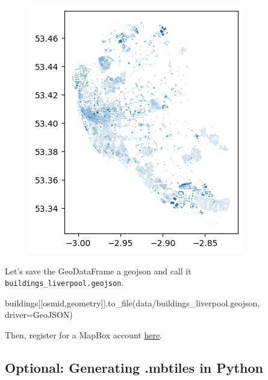 \documentclass[
  letterpaper,
  DIV=11,
  numbers=noendperiod]{scrreprt}
\newenvironment{Shaded}{\begin{snugshade}}{\end{snugshade}}
\newcommand{\NormalTok}[1]{\textcolor[rgb]{0.00,0.23,0.31}{#1}}
\newcommand{\OperatorTok}[1]{\textcolor[rgb]{0.37,0.37,0.37}{#1}}
\newcommand{\StringTok}[1]{\textcolor[rgb]{0.13,0.47,0.30}{#1}}
\begin{document}
\begin{figure}[H]

{\centering \includegraphics{labs/w05_dataArch_files/figure-pdf/cell-9-output-2.png}

}

\end{figure}

Let's save the GeoDataFrame a geojson and call it
\texttt{buildings\_liverpool.geojson}.

\begin{Shaded}
\begin{Highlighting}[]
\NormalTok{buildings[[}\StringTok{\textquotesingle{}osmid\textquotesingle{}}\NormalTok{,}\StringTok{\textquotesingle{}geometry\textquotesingle{}}\NormalTok{]].to\_file(}\StringTok{\textquotesingle{}data/buildings\_liverpool.geojson\textquotesingle{}}\NormalTok{,  driver}\OperatorTok{=}\StringTok{\textquotesingle{}GeoJSON\textquotesingle{}}\NormalTok{)}
\end{Highlighting}
\end{Shaded}

Then, register for a MapBox account
\href{https://account.mapbox.com/auth/signup/?route-to=\%22https\%3A\%2F\%2Faccount.mapbox.com\%2Faccess-tokens\%2F\%22}{here}.

\hypertarget{optional-generating-.mbtiles-in-python}{%
\subsection{Optional: Generating .mbtiles in
Python}\label{optional-generating-.mbtiles-in-python}}
\end{document}
